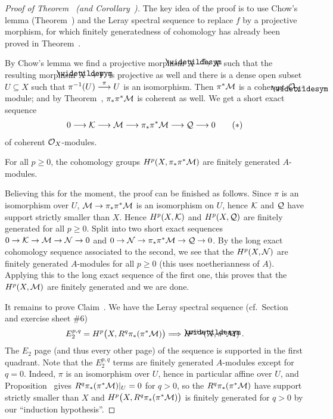 \documentclass[a4paper,parskip=half,numbers=enddot, DIV=12]{scrreprt}
\renewcommand{\geq}{\geqslant}
\begin{document}
\begin{proof}[Proof of Theorem~ (and Corollary~)]
	The key idea of the proof is to use Chow's lemma (Theorem~) and the Leray spectral sequence to replace $f$ by a projective morphism, for which finitely generatedness of cohomology has already been proved in Theorem~.
	
	By Chow's lemma we find a projective morphism $\snake{X}\morphism[\pi]X$ such that the resulting morphism $\snake{X}\morphism Y$ is projective as well and there is a dense open subset $U\subseteq X$ such that $\pi^{-1}(U)\morphism[\pi]U$ is an isomorphism. Then $\pi^*\mathcal{M}$ is a coherent $\Oo_{\snake{X}}$-module; and by Theorem~, $\pi_*\pi^*\mathcal{M}$ is coherent as well. We get a short exact sequence
	\begin{align}\lbl{eq:LESChow}
		0\morphism \Kk\morphism\Mm\morphism \pi_*\pi^*\Mm\morphism \Qq\morphism 0\tag{$*$}
	\end{align}
	of coherent $\mathcal{O}_X$-modules.
	\begin{claim}
		For all $p\geq 0$, the cohomology groups $H^p(X,\pi_*\pi^*\mathcal{M})$ are finitely generated $A$-modules.
	\end{claim}
	Believing this for the moment, the proof can be finished as follows. Since $\pi$ is an isomorphism over $U$, $\Mm\morphism\pi_*\pi^*\Mm$ is an isomorphism on $U$, hence $\mathcal{K}$ and $\mathcal{Q}$ have support strictly smaller than $X$. Hence $H^p(X,\mathcal{K})$ and $H^p(X,\mathcal{Q})$ are finitely generated for all $p\geq 0$. Split  into two short exact sequences $0\morphism\Kk\morphism\Mm\morphism\Nn\morphism 0$ and $0\morphism \Nn\morphism\pi_*\pi^*\Mm\morphism \Qq\morphism 0$. By the long exact cohomology sequence associated to the second, we see that the $H^p(X,\mathcal{N})$ are finitely generated $A$-modules for all $p\geq 0$ (this uses noetherianness of $A$). Applying this to the long exact sequence of the first one, this proves that the $H^p(X,\mathcal{M})$ are finitely generated and we are done.
	
	It remains to prove Claim~. We have the Leray spectral sequence (cf.\ Section~ and exercise sheet \#6)
	\begin{align*}
		E_2^{p,q}=H^p\big(X,R^q\pi_*(\pi^*\Mm)\big)\converge H^{p+q}(\snake{X},\pi^*\Mm)\;.
	\end{align*}
	The $E_2$ page (and thus every other page) of the sequence is supported in the first quadrant. Note that the $E_2^{p,q}$ terms are finitely generated $A$-modules except for $q=0$. Indeed, $\pi$ is an isomorphism over $U$, hence in particular affine over $U$, and Proposition~ gives $R^q\pi_*(\pi^*\mathcal{M})|_U=0$ for $q>0$, so the $R^q\pi_*(\pi^*\mathcal{M})$ have support strictly smaller than $X$ and $H^p\big(X,R^q\pi_*(\pi^*\mathcal{M})\big)$ is finitely generated for $q>0$ by our ``induction hypothesis''.
	

\end{proof}
\end{document}
